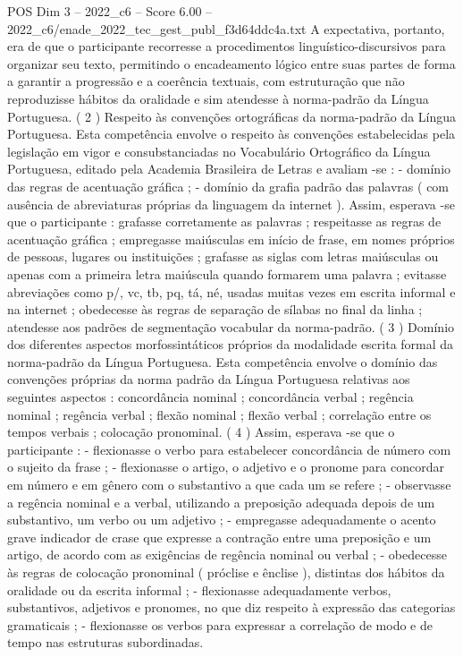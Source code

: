 \begin{textsample}{POS Dim 3 – 2022\_c6 – Score 6.00 – 2022\_c6/enade\_2022\_tec\_gest\_publ\_f3d64ddc4a.txt}
A expectativa, portanto, era de que o participante recorresse a procedimentos linguístico-discursivos para organizar seu texto, permitindo o encadeamento lógico entre suas partes de forma a garantir a progressão e a coerência textuais, com estruturação que não reproduzisse hábitos da oralidade e sim atendesse à norma-padrão da Língua Portuguesa. ( 2 ) Respeito às convenções ortográficas da norma-padrão da Língua Portuguesa.
Esta competência envolve o respeito às convenções estabelecidas pela legislação em vigor e consubstanciadas no Vocabulário Ortográfico da Língua Portuguesa, editado pela Academia Brasileira de Letras e avaliam -se : - domínio das regras de acentuação gráfica ; - domínio da grafia padrão das palavras ( com ausência de abreviaturas próprias da linguagem da internet ).
Assim, esperava -se que o participante : grafasse corretamente as palavras ; respeitasse as regras de acentuação gráfica ; empregasse maiúsculas em início de frase, em nomes próprios de pessoas, lugares ou instituições ; grafasse as siglas com letras maiúsculas ou apenas com a primeira letra maiúscula quando formarem uma palavra ; evitasse abreviações como p/, vc, tb, pq, tá, né, usadas muitas vezes em escrita informal e na internet ; obedecesse às regras de separação de sílabas no final da linha ; atendesse aos padrões de segmentação vocabular da norma-padrão. ( 3 ) Domínio dos diferentes aspectos morfossintáticos próprios da modalidade escrita formal da norma-padrão da Língua Portuguesa.
Esta competência envolve o domínio das convenções próprias da norma padrão da Língua Portuguesa relativas aos seguintes aspectos : concordância nominal ; concordância verbal ; regência nominal ; regência verbal ; flexão nominal ; flexão verbal ; correlação entre os tempos verbais ; colocação pronominal. ( 4 ) Assim, esperava -se que o participante : - flexionasse o verbo para estabelecer concordância de número com o sujeito da frase ; - flexionasse o artigo, o adjetivo e o pronome para concordar em número e em gênero com o substantivo a que cada um se refere ; - observasse a regência nominal e a verbal, utilizando a preposição adequada depois de um substantivo, um verbo ou um adjetivo ; - empregasse adequadamente o acento grave indicador de crase que expresse a contração entre uma preposição e um artigo, de acordo com as exigências de regência nominal ou verbal ; - obedecesse às regras de colocação pronominal ( próclise e ênclise ), distintas dos hábitos da oralidade ou da escrita informal ; - flexionasse adequadamente verbos, substantivos, adjetivos e pronomes, no que diz respeito à expressão das categorias gramaticais ; - flexionasse os verbos para expressar a correlação de modo e de tempo nas estruturas subordinadas.

\end{textsample}
